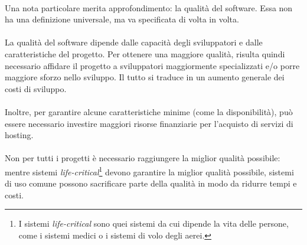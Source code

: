 \documentclass[11pt,a4paper,english]{article}
\begin{document}
\paragraph{} Una nota particolare merita approfondimento: la qualità del software. Essa non ha una definizione universale, ma va specificata di volta in volta.

\paragraph{} La qualità del software dipende dalle capacità degli sviluppatori e dalle caratteristiche del progetto. Per ottenere una maggiore qualità, risulta quindi necessario affidare il progetto a sviluppatori maggiormente specializzati e/o porre maggiore sforzo nello sviluppo. Il tutto si traduce in un aumento generale dei costi di sviluppo. 

\paragraph{} Inoltre, per garantire alcune caratteristiche minime (come la disponibilità), può essere necessario investire maggiori risorse finanziarie per l'acquisto di servizi di hosting.

\paragraph{} Non per tutti i progetti è necessario raggiungere la miglior qualità possibile: mentre sistemi \emph{life-critical}\footnote{I sistemi \emph{life-critical} sono quei sistemi da cui dipende la vita delle persone, come i sistemi medici o i sistemi di volo degli aerei.} devono garantire la miglior qualità possibile, sistemi di uso comune possono sacrificare parte della qualità in modo da ridurre tempi e costi. 
\end{document}
